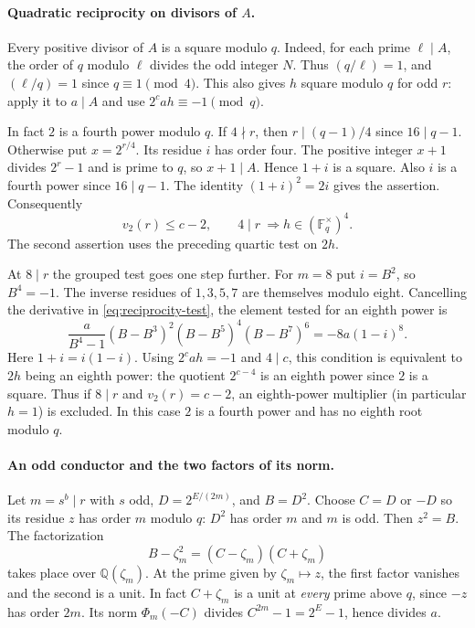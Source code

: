 \documentclass[11pt]{article}
\begin{document}
\paragraph{Quadratic reciprocity on divisors of $A$.}
Every positive divisor of $A$ is a square modulo $q$.
Indeed, for each prime $\ell\mid A$, the order of $q$ modulo $\ell$
divides the odd integer $N$. Thus $(q/\ell)=1$, and
$(\ell/q)=1$ since $q\equiv1\pmod4$. This also gives $h$ square
modulo $q$ for odd $r$: apply it to $a\mid A$ and use
$2^cah\equiv-1\pmod q$.

In fact $2$ is a fourth power modulo $q$. If $4\nmid r$, then
$r\mid(q-1)/4$ since $16\mid q-1$. Otherwise put $x=2^{r/4}$.
Its residue $i$ has order four. The positive integer $x+1$ divides
$2^r-1$ and is prime to $q$, so $x+1\mid A$. Hence $1+i$ is a
square. Also $i$ is a fourth power since $16\mid q-1$. The identity
$(1+i)^2=2i$ gives the assertion. Consequently
\[
 v_2(r)\le c-2,\qquad 4\mid r\ \Longrightarrow h\in(\mathbb F_q^\times)^4 .
\]
The second assertion uses the preceding quartic test on $2h$.

At $8\mid r$ the grouped test goes one step further. For $m=8$
put $i=B^2$, so $B^4=-1$. The inverse residues of $1,3,5,7$
are themselves modulo eight. Cancelling the derivative in
\eqref{eq:reciprocity-test}, the element tested for an eighth power is
\[
 \frac{a}{B^4-1}(B-B^3)^2(B-B^5)^4(B-B^7)^6
      =-8a(1-i)^8 .
\]
Here $1+i=i(1-i)$. Using $2^cah=-1$ and $4\mid c$, this
condition is equivalent to $2h$ being an eighth power: the quotient
$2^{c-4}$ is an eighth power since $2$ is a square.
Thus if $8\mid r$ and $v_2(r)=c-2$, an eighth-power multiplier
(in particular $h=1$) is excluded. In this case $2$ is a fourth
power and has no eighth root modulo $q$.

\paragraph{An odd conductor and the two factors of its norm.}
Let $m=s^b\mid r$ with $s$ odd, $D=2^{E/(2m)}$, and $B=D^2$.
Choose $C=D$ or $-D$ so its residue $z$ has order $m$ modulo $q$:
$D^2$ has order $m$ and $m$ is odd. Then $z^2=B$. The factorization
\[
 B-\zeta_m^2=(C-\zeta_m)(C+\zeta_m)
\]
takes place over $\mathbb Q(\zeta_m)$. At the prime given by
$\zeta_m\mapsto z$, the first factor vanishes and the second is a unit.
In fact $C+\zeta_m$ is a unit at \emph{every} prime above $q$, since
$-z$ has order $2m$. Its norm $\Phi_m(-C)$ divides
$C^{2m}-1=2^E-1$, hence divides $a$.
\end{document}
